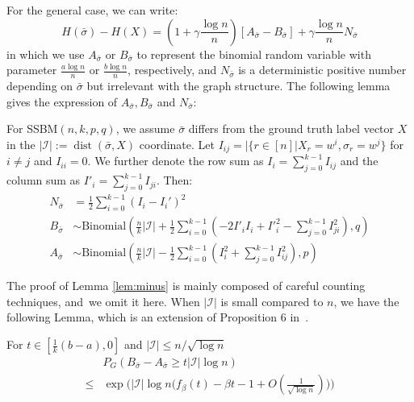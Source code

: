 \documentclass[entropy,article,accept,moreauthors,pdftex]{Definitions/mdpi}
\newcommand{\A}{\frac{a \log n}{n}}
\newcommand{\B}{\frac{b \log n}{n}}
\newcommand{\cI}{\mathcal{I}}
\newcommand{\1}{\mathbbm{1}}
\DeclareMathOperator{\Dist}{dist}
\begin{document}
\begin{paracol}{2}
For the general case, we can write:
\begin{equation}\label{eq:Hgeneral}
H(\bar{\sigma}) - H(X)=
(1 + \gamma \frac{ \log n}{n})[A_{\bar{\sigma}} - B_{\bar{\sigma}}] + \gamma\frac{ \log n}{n} N_{\bar{\sigma}}
\end{equation}
in which we use $A_{\bar{\sigma}}$ or $B_{\bar{\sigma}}$ to represent the binomial random variable with parameter $\A$ or $\B$,
respectively, and $N_{\bar{\sigma}}$ is a deterministic positive number depending on $\bar{\sigma}$ but irrelevant with the graph structure.
The following lemma gives the expression of $A_{\bar{\sigma}}, B_{\bar{\sigma}}$ and $N_{\bar{\sigma}}$:
\begin{Lemma}\label{lem:minus}
	For SSBM$(n,k,p,q)$, we assume $\bar{\sigma}$ differs from the ground truth label vector $X$ in the $|\cI|:=\Dist(\bar{\sigma}, X)$ coordinate.
	Let $I_{ij} = |\{r\in [n] | X_r = w^i, \sigma_r = w^j \}$ for $i\neq j$ and $I_{ii} = 0$. We further denote the row sum as $I_i = \sum_{j=0}^{k-1} I_{ij}$ and
	the column sum as $I'_i = \sum_{j=0}^{k-1} I_{ji}$.
	Then:
\begin{align}
	N_{\bar{\sigma}} &= \frac{1}{2}\sum_{i=0}^{k-1} (I_i - I_i')^2 \label{eq:N_w} \\
	B_{\bar{\sigma}} & \sim \textrm{Binomial}(\frac{n}{k}|\cI| + \frac{1}{2}\sum_{i=0}^{k-1}  (-2 I'_i I_i  + I'^2_i - \sum_{j=0}^{k-1} I^2_{ji}) , q)\\
	A_{\bar{\sigma}} & \sim \textrm{Binomial}(\frac{n}{k}|\cI| - \frac{1}{2}\sum_{i=0}^{k-1}  (I^2_i + \sum_{j=0}^{k-1} I^2_{ij}), p) \label{eq:A_w}
	\end{align}
\end{Lemma}
The proof of Lemma \ref{lem:minus} is mainly composed of careful counting techniques, and~we omit it here.
When $|\cI|$ is small compared to $n$, we have the following Lemma, which is an extension of Proposition 6 in~\cite{ye2020exact}. 
\begin{Lemma}\label{lem:enhanced_fb}
	For $t\in [\frac{1}{k}(b-a), 0]$
	and $ |\cI| \le n/\sqrt{\log n}$
\begin{equation} \label{eq:upmpt}
	\begin{aligned}
	& P_G(B_{\bar{\sigma}}-A_{\bar{\sigma}}\ge t |\cI| \log n)  \\
	\le & \exp\Big(|\cI|\log n
	\Big(f_{\beta}(t) - \beta t -1	+ O(\frac{1}{\sqrt{\log n}}) \Big)\Big)
	\end{aligned}
	\end{equation}

\end{Lemma}
\end{paracol}
\end{document}
